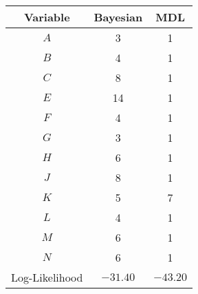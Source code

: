 \scriptsize
\begin{tabular}{@{}ccc@{}}
\toprule
Variable   & Bayesian & MDL          \\
\midrule
$A$    & 3        & 1      \\
$B$    & 4        & 1      \\
$C$    & 8        & 1      \\
$E$    & 14       & 1      \\
$F$    & 4        & 1      \\
$G$    & 3        & 1      \\
$H$    & 6        & 1      \\
$J$    & 8        & 1      \\
$K$    & 5        & 7      \\
$L$    & 4        & 1      \\
$M$    & 6        & 1      \\
$N$    & 6        & 1      \\
\midrule
Log-Likelihood   & $-31.40$   & $-43.20$ \\
\bottomrule
\end{tabular}
